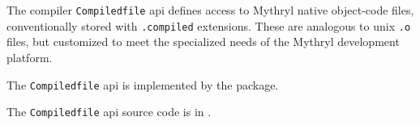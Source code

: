 
The compiler {\tt Compiledfile} api defines access to Mythryl native object-code files, 
conventionally stored with {\tt .compiled} extensions.  These are analogous to unix 
{\tt .o} files, but customized to meet the specialized needs of the Mythryl 
development platform.

The {\tt Compiledfile} api is implemented by the  package.

The {\tt Compiledfile} api source code is in .

